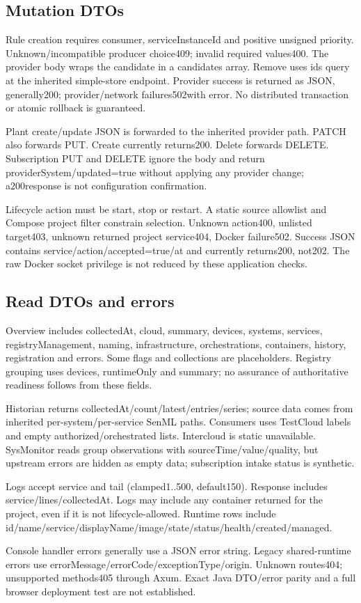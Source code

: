 \documentclass[a4paper]{arrowhead}
\begin{document}
\subsection{Mutation DTOs}
\par
Rule creation requires consumer, serviceInstanceId and positive unsigned priority. Unknown/incompatible producer choice409; invalid required values400. The provider body wraps the candidate in a candidates array. Remove uses ids query at the inherited simple-store endpoint. Provider success is returned as JSON, generally200; provider/network failures502with error. No distributed transaction or atomic rollback is guaranteed.
\par
Plant create/update JSON is forwarded to the inherited provider path. PATCH also forwards PUT. Create currently returns200. Delete forwards DELETE. Subscription PUT and DELETE ignore the body and return providerSystem/updated=true without applying any provider change; a200response is not configuration confirmation.
\par
Lifecycle action must be start, stop or restart. A static source allowlist and Compose project filter constrain selection. Unknown action400, unlisted target403, unknown returned project service404, Docker failure502. Success JSON contains service/action/accepted=true/at and currently returns200, not202. The raw Docker socket privilege is not reduced by these application checks.
\par
\subsection{Read DTOs and errors}
\par
Overview includes collectedAt, cloud, summary, devices, systems, services, registryManagement, naming, infrastructure, orchestrations, containers, history, registration and errors. Some flags and collections are placeholders. Registry grouping uses devices, runtimeOnly and summary; no assurance of authoritative readiness follows from these fields.
\par
Historian returns collectedAt/count/latest/entries/series; source data comes from inherited per-system/per-service SenML paths. Consumers uses TestCloud labels and empty authorized/orchestrated lists. Intercloud is static unavailable. SysMonitor reads group observations with sourceTime/value/quality, but upstream errors are hidden as empty data; subscription intake status is synthetic.
\par
Logs accept service and tail (clamped1..500, default150). Response includes service/lines/collectedAt. Logs may include any container returned for the project, even if it is not lifecycle-allowed. Runtime rows include id/name/service/displayName/image/state/status/health/created/managed.
\par
Console handler errors generally use a JSON error string. Legacy shared-runtime errors use errorMessage/errorCode/exceptionType/origin. Unknown routes404; unsupported methods405 through Axum. Exact Java DTO/error parity and a full browser deployment test are not established.
\clearpage
\end{document}

